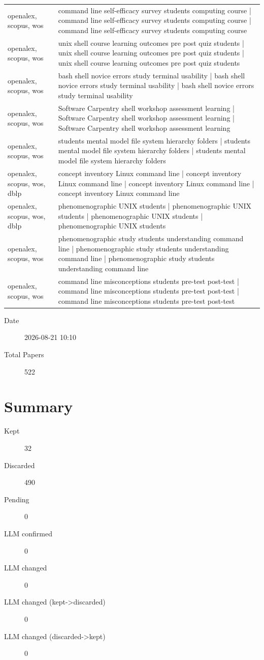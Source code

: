 \documentclass{article}
\begin{document}
\begin{longtable}{lp{10cm}}
openalex, scopus, wos & command line self-efficacy survey students computing course | command line self-efficacy survey students computing course | command line self-efficacy survey students computing course \\
openalex, scopus, wos & unix shell course learning outcomes pre post quiz students | unix shell course learning outcomes pre post quiz students | unix shell course learning outcomes pre post quiz students \\
openalex, scopus, wos & bash shell novice errors study terminal usability | bash shell novice errors study terminal usability | bash shell novice errors study terminal usability \\
openalex, scopus, wos & Software Carpentry shell workshop assessment learning | Software Carpentry shell workshop assessment learning | Software Carpentry shell workshop assessment learning \\
openalex, scopus, wos & students mental model file system hierarchy folders | students mental model file system hierarchy folders | students mental model file system hierarchy folders \\
openalex, scopus, wos, dblp & concept inventory Linux command line | concept inventory Linux command line | concept inventory Linux command line | concept inventory Linux command line \\
openalex, scopus, wos, dblp & phenomenographic UNIX students | phenomenographic UNIX students | phenomenographic UNIX students | phenomenographic UNIX students \\
openalex, scopus, wos & phenomenographic study students understanding command line | phenomenographic study students understanding command line | phenomenographic study students understanding command line \\
openalex, scopus, wos & command line misconceptions students pre-test post-test | command line misconceptions students pre-test post-test | command line misconceptions students pre-test post-test \\
\bottomrule
\end{longtable}

\begin{description}
\item[Date] 2026-08-21 10:10
\item[Total Papers] 522
\end{description}

\section{Summary}
\begin{description}
\item[Kept] 32
\item[Discarded] 490
\item[Pending] 0
\item[LLM confirmed] 0
\item[LLM changed] 0
\item[LLM changed (kept->discarded)] 0
\item[LLM changed (discarded->kept)] 0
\end{description}
\end{document}
